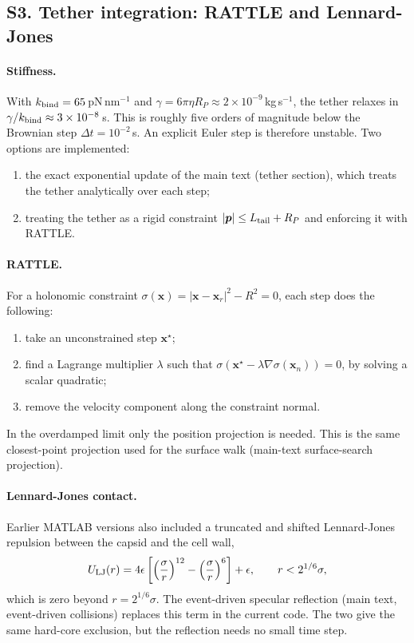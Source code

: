 \subsection*{S3. Tether integration: RATTLE and Lennard-Jones}
\paragraph{Stiffness.} With $k_{\rm bind}=65$\,pN\,nm$^{-1}$ and $\gamma=6\pi\eta R_P\approx 2\times10^{-9}$\,kg\,s$^{-1}$, the tether relaxes in $\gamma/k_{\rm bind}\approx3\times10^{-8}$\,s. This is roughly five orders of magnitude below the Brownian step $\Delta t=10^{-2}$\,s. An explicit Euler step is therefore unstable. Two options are implemented:
\begin{enumerate}
\item the exact exponential update of the main text (tether section), which treats the tether analytically over each step;
\item treating the tether as a rigid constraint $|\bm p|\le L_{\rm tail}+R_P$ and enforcing it with RATTLE\cite{andersen1983rattle}.
\end{enumerate}

\paragraph{RATTLE.} For a holonomic constraint $\sigma(\bm x)=|\bm x-\bm x_r|^2-R^2=0$, each step does the following:
\begin{enumerate}
\item take an unconstrained step $\bm x^\star$;
\item find a Lagrange multiplier $\lambda$ such that $\sigma(\bm x^\star-\lambda\nabla\sigma(\bm x_{n}))=0$, by solving a scalar quadratic;
\item remove the velocity component along the constraint normal.
\end{enumerate}
In the overdamped limit only the position projection is needed. This is the same closest-point projection used for the surface walk (main-text surface-search projection).

\paragraph{Lennard-Jones contact.} Earlier MATLAB versions also included a truncated and shifted Lennard-Jones repulsion between the capsid and the cell wall,
\begin{equation}
U_{\rm LJ}(r)=4\epsilon\left[\left(\frac{\sigma}{r}\right)^{12}-\left(\frac{\sigma}{r}\right)^{6}\right]+\epsilon,\qquad r<2^{1/6}\sigma ,
\end{equation}
which is zero beyond $r=2^{1/6}\sigma$. The event-driven specular reflection (main text, event-driven collisions) replaces this term in the current code. The two give the same hard-core exclusion, but the reflection needs no small time step.

